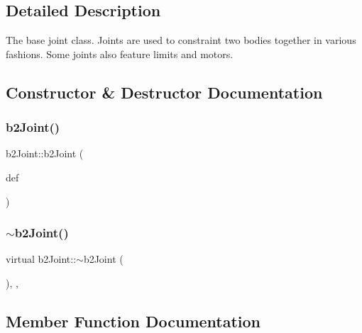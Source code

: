 \subsection{Detailed Description}
The base joint class. Joints are used to constraint two bodies together in various fashions. Some joints also feature limits and motors. 

\subsection{Constructor \& Destructor Documentation}
\mbox{\label{classb2_joint_a8d6cce91546335fe95325d5e29c06a19}} 
\subsubsection{\texorpdfstring{b2Joint()}{b2Joint()}}
{\footnotesize\ttfamily b2\+Joint\+::b2\+Joint (\begin{DoxyParamCaption}\item[{const \mbox{\hyperlink{structb2_joint_def}{b2\+Joint\+Def}} $\ast$}]{def }\end{DoxyParamCaption})\hspace{0.3cm}{\ttfamily [protected]}}

\mbox{\label{classb2_joint_ab44cde7b81c3e77540400e0da90d6ceb}} 
\subsubsection{\texorpdfstring{$\sim$b2Joint()}{~b2Joint()}}
{\footnotesize\ttfamily virtual b2\+Joint\+::$\sim$b2\+Joint (\begin{DoxyParamCaption}{ }\end{DoxyParamCaption})\hspace{0.3cm}{\ttfamily [inline]}, {\ttfamily [protected]}, {\ttfamily [virtual]}}



\subsection{Member Function Documentation}
\mbox{\label{classb2_joint_a2e500c93107d0bf6b0a21654528faeab}} 
